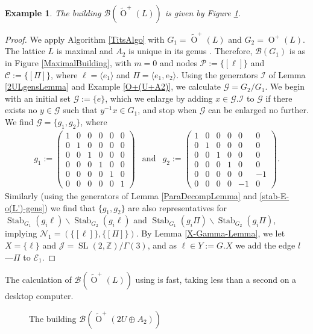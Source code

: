 \documentclass[12pt, a4paper]{article}
\newtheorem{example}[theorem]{Example}
\newcommand{\ZZ}{\mathbb{Z}}
\newcommand{\la}{\langle}
\newcommand{\ra}{\rangle}
\newcommand{\beq}{\begin{equation*}}
\newcommand{\eeq}{\end{equation*}}
\newcommand{\bc}{\mathcal{B}}
\newcommand{\cc}{\mathcal{C}}
\newcommand{\ec}{\mathcal{E}}
\newcommand{\gc}{\mathcal{G}}
\newcommand{\ic}{\mathcal{I}}
\newcommand{\jc}{\mathcal{J}}
\newcommand{\nc}{\mathcal{N}}
\newcommand{\pc}{\mathcal{P}}
\newcommand{\opn}{\operatorname}
\newcommand{\op}{\oplus}
\newcommand{\bpm}{\begin{pmatrix}}
\newcommand{\epm}{\end{pmatrix}}
\newcommand{\otl}{\widetilde{\opn{O}}^+(L)}
\begin{document}
\begin{example}
  The building $\bc(\otl)$ is given by Figure \ref{stable_2U_A2_tits}.
\end{example}
\begin{proof}
  We apply Algorithm \ref{TitsAlgo} with $G_1=\otl$ and $G_2=\opn{O}^+(L)$.
  The lattice $L$ is maximal and $A_2$ is unique in its genus \cite[Table 15.1 p.360]{SPLAG}.
  Therefore, $\bc(G_1)$ is as in Figure \ref{MaximalBuilding}, with $m=0$ and nodes $\pc:=\{ [\ell] \}$ and $\cc:=\{ [\Pi] \}$,
  where $\ell = \la e_1 \ra$ and $\Pi = \la e_1, e_2 \ra$.
  Using the generators $\ic$ of Lemma \ref{2ULgensLemma} and Example \ref{O+(U+A2)}, we calculate $\gc=G_2 / G_1$.
  We begin with an initial set $\gc := \{e \}$, which we enlarge by adding $x \in \gc. \ic$ to $\gc$ if there exists no $y \in \gc$ such that $y^{-1}x \in G_1$, and stop when $\gc$ can be enlarged no further.
  We find $\gc = \{g_1, g_2 \}$, where 
\beq
  \begin{array}{ccc}
    g_1:=\bpm
    1 & 0 & 0 & 0 & 0 & 0 \\
    0 & 1 & 0 & 0 & 0 & 0 \\
    0 & 0 & 1 & 0 & 0 & 0 \\
    0 & 0 & 0 & 1 & 0 & 0 \\
    0 & 0 & 0 & 0 & 1 & 0 \\
    0 & 0 & 0 & 0 & 0 & 1
    \epm
    & \text{and} &
    g_2:= \bpm
    1 & 0 & 0 & 0 & 0 & 0 \\
    0 & 1 & 0 & 0 & 0 & 0 \\
    0 & 0 & 1 & 0 & 0 & 0 \\
    0 & 0 & 0 & 1 & 0 & 0 \\
    0 & 0 & 0 & 0 & 0 & -1 \\
    0 & 0 & 0 & 0 & -1 & 0
    \epm.
  \end{array}
\eeq
Similarly (using the generators of Lemma \ref{ParaDecompLemma} and \ref{stab-E-o(L')-gens}) we find that $\{g_1, g_2 \}$ are also representatives for 
  $\opn{Stab}_{G_1}(g_i \ell) \backslash \opn{Stab}_{G_2}(g_i \ell)$
  and
  $\opn{Stab}_{G_1}(g_i \Pi) \backslash \opn{Stab}_{G_2}(g_i \Pi)$, 
implying $\nc_1 = (\{[\ell] \}, \{[\Pi]\})$.
  By Lemma \ref{X-Gamma-Lemma}, we let $X=\{\ell \}$ and $\jc = \opn{SL}(2, \ZZ)/\Gamma(3)$, and as $\ell \in Y:=G.X$ we add the edge $l$---$\Pi$ to $\ec_1$. 
\end{proof}
The calculation of $\bc(\otl)$ using \cite{boundary} is fast, taking less than a second on a desktop computer.
\begin{figure}
  \centering
  \caption{The building $\bc(\widetilde{\opn{O}}^+(2U \op A_2))$}\label{stable_2U_A2_tits}
\end{figure}
\end{document}
